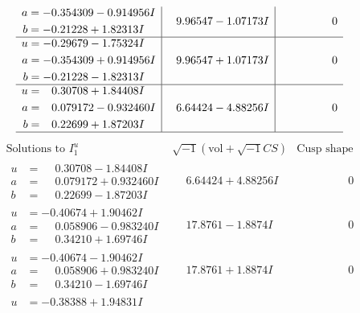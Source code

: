 \documentclass[1p]{elsarticle_modified}
\theoremstyle{definition}
\newcommand{\I}{\sqrt{-1}}
\begin{document}
$$\begin{array}{c|c|c}
\begin{aligned}
a &= -0.354309 - 0.914956 I \\
b &= -0.21228 + 1.82313 I\end{aligned}
 & \phantom{-}9.96547 - 1.07173 I & \phantom{-0.000000 } 0 \\ \hline\begin{aligned}
u &= -0.29679 - 1.75324 I \\
a &= -0.354309 + 0.914956 I \\
b &= -0.21228 - 1.82313 I\end{aligned}
 & \phantom{-}9.96547 + 1.07173 I & \phantom{-0.000000 } 0 \\ \hline\begin{aligned}
u &= \phantom{-}0.30708 + 1.84408 I \\
a &= \phantom{-}0.079172 - 0.932460 I \\
b &= \phantom{-}0.22699 + 1.87203 I\end{aligned}
 & \phantom{-}6.64424 - 4.88256 I & \phantom{-0.000000 } 0\\
 \hline 
 \end{array}$$\newpage$$\begin{array}{c|c|c}  
\text{Solutions to }I^u_{1}& \I (\text{vol} + \sqrt{-1}CS) & \text{Cusp shape}\\
 \hline 
\begin{aligned}
u &= \phantom{-}0.30708 - 1.84408 I \\
a &= \phantom{-}0.079172 + 0.932460 I \\
b &= \phantom{-}0.22699 - 1.87203 I\end{aligned}
 & \phantom{-}6.64424 + 4.88256 I & \phantom{-0.000000 } 0 \\ \hline\begin{aligned}
u &= -0.40674 + 1.90462 I \\
a &= \phantom{-}0.058906 - 0.983240 I \\
b &= \phantom{-}0.34210 + 1.69746 I\end{aligned}
 & \phantom{-}17.8761 - 1.8874 I & \phantom{-0.000000 } 0 \\ \hline\begin{aligned}
u &= -0.40674 - 1.90462 I \\
a &= \phantom{-}0.058906 + 0.983240 I \\
b &= \phantom{-}0.34210 - 1.69746 I\end{aligned}
 & \phantom{-}17.8761 + 1.8874 I & \phantom{-0.000000 } 0 \\ \hline\begin{aligned}
u &= -0.38388 + 1.94831 I \\

\end{aligned}
\end{array}$$
\end{document}
